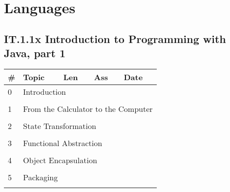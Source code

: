\documentclass[a4paper,12pt]{article} %
\begin{document}
\newpage
\section{Languages}
\subsection{IT.1.1x Introduction to Programming with Java, part 1}

\begin{longtable}{|l|p{11cm}|l|l|l|}
	\hline
	\# & Topic & Len & Ass & Date \\
	\hline
	0 & \multicolumn{4}{|l|}{Introduction}\\
	\hline
	& & & &  \\
	\hline
	1 & \multicolumn{4}{|l|}{From the Calculator to the Computer}\\
	\hline
	& & & &  \\
	\hline
	2 & \multicolumn{4}{|l|}{State Transformation}\\
	\hline
	& & & &  \\
	\hline
	3 & \multicolumn{4}{|l|}{Functional Abstraction}\\
	\hline
	& & & &  \\
	\hline
	4 & \multicolumn{4}{|l|}{Object Encapsulation}\\
	\hline
	& & & &  \\
	\hline
	5 & \multicolumn{4}{|l|}{Packaging}\\
	\hline
	& & & &  \\
	\hline
\end{longtable}

\end{document}
